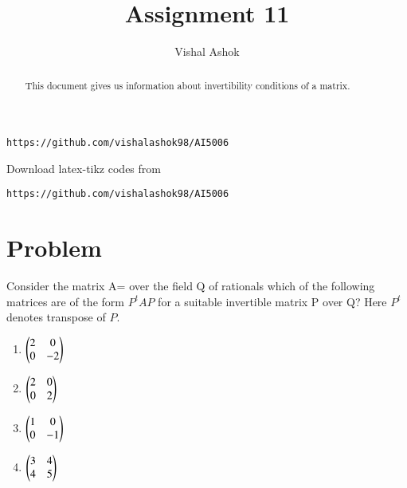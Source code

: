 \documentclass[journal,12pt,twocolumn]{IEEEtran}
\begin{document}
\makeatletter
{}
\makeatother
\let\StandardTheFigure\thefigure
\let\vec\mathbf
\renewcommand{\thefigure}{\theproblem}
\def\putbox#1#2#3{\makebox[0in][l]{\makebox[#1][l]{}\raisebox{\baselineskip}[0in][0in]{\raisebox{#2}[0in][0in]{#3}}}}
     \def\rightbox#1{\makebox[0in][r]{#1}}
     \def\centbox#1{\makebox[0in]{#1}}
     \def\topbox#1{\raisebox{-\baselineskip}[0in][0in]{#1}}
     \def\midbox#1{\raisebox{-0.5\baselineskip}[0in][0in]{#1}}
\vspace{3cm}
\title{Assignment 11}
\author{Vishal Ashok}
\maketitle
\newpage
\bigskip
\renewcommand{\thefigure}{\theenumi}
\renewcommand{\thetable}{\theenumi}
\begin{abstract}
This document gives us information about invertibility conditions of a matrix.
\end{abstract}

%
\begin{lstlisting}
https://github.com/vishalashok98/AI5006\end{lstlisting}
%
Download latex-tikz codes from 
%
\begin{lstlisting}
https://github.com/vishalashok98/AI5006\end{lstlisting}
%
\section{Problem}
Consider the matrix A= over the field Q of rationals which of the following matrices are of the form $P^{t}AP$ for a suitable invertible matrix P over Q?
Here $P^{t}$ denotes transpose of $P$.

\begin{enumerate}
    \item $\displaystyle{\ensuremath{\begin{pmatrix}2 & 0 \\
0 & -2 \end{pmatrix}}}$

    \item $\displaystyle{\ensuremath{\begin{pmatrix}2 & 0  \\
0 & 2   
\end{pmatrix}}}$

    \item $\displaystyle{\ensuremath{\begin{pmatrix}1 & 0  \\
0 & -1
\end{pmatrix}}}$

    \item $\displaystyle{\myvec{3 & 4  \\
4 & 5 
  
}}$



\end{enumerate}
\end{document}
